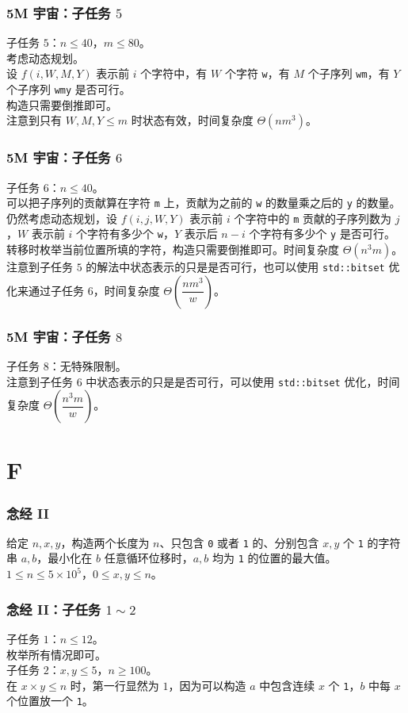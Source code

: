 \documentclass{beamer}
\begin{document}
\begin{frame}
\frametitle{5M 宇宙：子任务 $5$}
子任务 $5$：$n \leq 40$，$m \leq 80$。\\
\pause
考虑动态规划。\\
\pause
设 $f(i,W,M,Y)$ 表示前 $i$ 个字符中，有 $W$ 个字符 \texttt{w}，有 $M$ 个子序列 \texttt{wm}，有 $Y$ 个子序列 \texttt{wmy} 是否可行。\\
\pause
构造只需要倒推即可。\\
\pause
注意到只有 $W,M,Y \leq m$ 时状态有效，时间复杂度 $\Theta(n m^3)$。
\end{frame}

\begin{frame}
\frametitle{5M 宇宙：子任务 $6$}
子任务 $6$：$n \leq 40$。\\
\pause
可以把子序列的贡献算在字符 \texttt{m} 上，贡献为之前的 \texttt{w} 的数量乘之后的 \texttt{y} 的数量。\\
\pause
仍然考虑动态规划，设 $f(i, j, W, Y)$ 表示前 $i$ 个字符中的 \texttt{m} 贡献的子序列数为 $j$，$W$ 表示前 $i$ 个字符有多少个 \texttt{w}，$Y$ 表示后 $n-i$ 个字符有多少个 \texttt{y} 是否可行。转移时枚举当前位置所填的字符，构造只需要倒推即可。时间复杂度 $\Theta(n^3 m)$。\\
\pause
注意到子任务 $5$ 的解法中状态表示的只是是否可行，也可以使用 \texttt{std::bitset} 优化来通过子任务 $6$，时间复杂度 $\Theta\left(\dfrac{n m^3}{w}\right)$。
\end{frame}

\begin{frame}
\frametitle{5M 宇宙：子任务 $8$}
子任务 $8$：无特殊限制。\\
\pause
注意到子任务 $6$ 中状态表示的只是是否可行，可以使用 \texttt{std::bitset} 优化，时间复杂度 $\Theta\left(\dfrac{n^3 m}{w}\right)$。
\end{frame}

\section{F}

\begin{frame}
\frametitle{念经 II}
给定 $n,x,y$，构造两个长度为 $n$、只包含 \texttt{0} 或者 \texttt{1} 的、分别包含 $x,y$ 个 \texttt{1} 的字符串 $a,b$，最小化在 $b$ 任意循环位移时，$a,b$ 均为 \texttt{1} 的位置的最大值。\\
$1 \leq n \leq 5 \times 10^5$，$0 \leq x,y \leq n$。
\end{frame}

\begin{frame}
\frametitle{念经 II：子任务 $1 \sim 2$}
子任务 $1$：$n \leq 12$。\\
\pause
枚举所有情况即可。\\
\pause
子任务 $2$：$x,y \leq 5$，$n \geq 100$。\\
\pause
在 $x \times y \leq n$ 时，第一行显然为 $1$，因为可以构造 $a$ 中包含连续 $x$ 个 \texttt{1}，$b$ 中每 $x$ 个位置放一个 \texttt{1}。
\end{frame}
\end{document}
